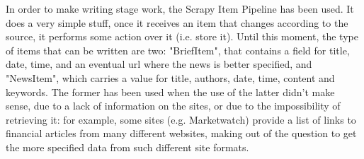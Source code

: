 In order to make writing stage work, the Scrapy Item Pipeline \cite{scrapypipeline} has been used. It does a very simple stuff, once it receives an item that changes according to the source, it performs some action over it (i.e. store it). Until this moment, the type of items that can be written are two: "BriefItem", that contains a field for title, date, time, and an eventual url where the news is better specified, and "NewsItem", which carries a value for title, authors, date, time, content and keywords. The former has been used when the use of the latter didn't make sense, due to a lack of information on the sites, or due to the impossibility of retrieving it: for example, some sites (e.g. Marketwatch) provide a list of links to financial articles from many different websites, making out of the question to get the more specified data from such different site formats.
